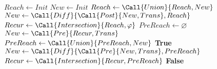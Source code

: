 \documentclass{article}
\begin{document}
\begin{algorithmic}[1]
    \State $Reach \gets Init$
    \State $New \gets Init$
    \State $Reach \gets \Call{Union}{Reach, New}$
    \State $New \gets \Call{Diff}{\Call{Post}{New, Trans}, Reach}$
    \EndWhile
    \State $Recur \gets \Call{Intersection}{Reach, \varphi}$
    \State $PreReach \gets \varnothing$
    \State $New \gets \Call{Pre}{Recur, Trans}$
    \State $PreReach \gets \Call{Union}{PreReach, New}$
    \State \Return \textbf{True}
    \EndIf
    \State $New \gets \Call{Diff}{\Call{Pre}{New, Trans}, PreReach}$
    \EndWhile
    \State $Recur \gets \Call{Intersection}{Recur, PreReach}$
    \EndWhile
    \Return \textbf{False}
    \EndProcedure
\end{algorithmic}
\end{document}
